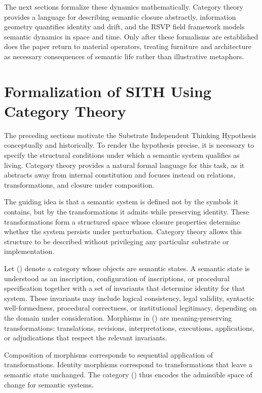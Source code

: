 \documentclass[11pt,oneside]{article}
\begin{document}
The next sections formalize these dynamics mathematically. Category theory provides a language for describing semantic closure abstractly, information geometry quantifies identity and drift, and the RSVP field framework models semantic dynamics in space and time. Only after these formalisms are established does the paper return to material operators, treating furniture and architecture as necessary consequences of semantic life rather than illustrative metaphors.

\section{Formalization of SITH Using Category Theory}

The preceding sections motivate the Substrate Independent Thinking Hypothesis conceptually and historically. To render the hypothesis precise, it is necessary to specify the structural conditions under which a semantic system qualifies as living. Category theory provides a natural formal language for this task, as it abstracts away from internal constitution and focuses instead on relations, transformations, and closure under composition.

The guiding idea is that a semantic system is defined not by the symbols it contains, but by the transformations it admits while preserving identity. These transformations form a structured space whose closure properties determine whether the system persists under perturbation. Category theory allows this structure to be described without privileging any particular substrate or implementation.

Let () denote a category whose objects are semantic states. A semantic state is understood as an inscription, configuration of inscriptions, or procedural specification together with a set of invariants that determine identity for that system. These invariants may include logical consistency, legal validity, syntactic well-formedness, procedural correctness, or institutional legitimacy, depending on the domain under consideration. Morphisms in () are meaning-preserving transformations: translations, revisions, interpretations, executions, applications, or adjudications that respect the relevant invariants.

Composition of morphisms corresponds to sequential application of transformations. Identity morphisms correspond to transformations that leave a semantic state unchanged. The category () thus encodes the admissible space of change for semantic systems.
\end{document}
